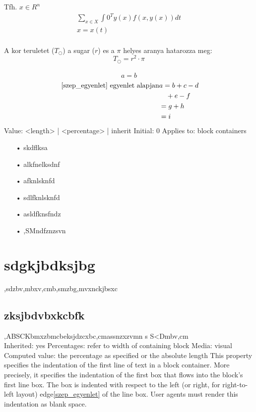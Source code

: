 \documentclass{article}
\begin{document}
Tfh. $x \in R^n$
 \begin{eqnarray}
 \label{szep_egyenlet} 
  \sum_{x \in X}\int{0}^T y(x)f(x,y(x)) dt 
  \\ x=x(t) 
 \end{eqnarray}
  \\
   A kor teruletet ($T_\bigcirc$) a sugar ($r$) es a $\pi$ helyes aranya hatarozza meg:
    \\
    \begin{equation}
    	T_\bigcirc=r^2\cdot\pi 
    \end{equation}
    \\
    \begin{equation}
a=b
\end{equation}
\begin{eqnarray}
\text{
\eqref{szep_egyenlet} egyenlet alapjan}
&a =b+c-d\\
 & \quad +e-f\\
 & =g+h\\
 & =i
\end{eqnarray}
Value:  	<length> | <percentage> | inherit
Initial:  	0
Applies to:  	block containers
\begin{enumerate}
\item[•] skdflksa\\
\item[•] alkfnelksdnf\\
\item[•] afknlsknfd\\
\item[•] sdlfknlsknfd\\
\item[•] asldfknsfndz\\
\item[•] ,SMndfznzsvn\\
\end{enumerate}
\section{sdgkjbdksjbg}
,sdzbv,mbxv,cmb,smzbg,mvxnckjbsxc
\subsection{zksjbdvbxkcbfk}
,ABSCKbmxzbmcbeksjdzcxbc,cmassnzxzvmn s
S<Dmbv,cm\\

Inherited:  	yes
Percentages:  	refer to width of containing block
Media:  	visual
Computed value:  	the percentage as specified or the absolute length
This property specifies the indentation of the first line of text in a block container. More precisely, it specifies the indentation of the first box that flows into the block's first line box. The box is indented with respect to the left (or right, for right-to-left layout) edge\eqref{szep_egyenlet} of the line box. User agents must render this indentation as blank space.
\end{document}
